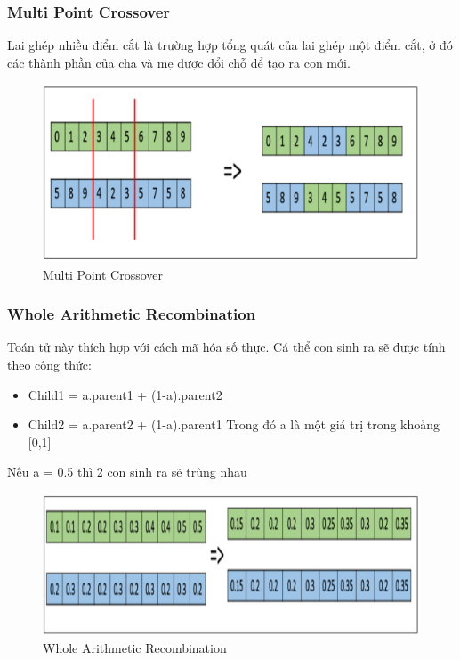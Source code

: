 \documentclass[a4paper,12pt]{report}
\begin{document}
\subsubsection{Multi Point Crossover}
Lai ghép nhiều điểm cắt là trường hợp tổng quát của lai ghép một điểm cắt, ở đó các thành phần của cha và mẹ được đổi chỗ để tạo ra con mới.
\begin{figure}[H]
\centering
\includegraphics[scale=0.4]{multi_point_crossover.png}
\caption{Multi Point Crossover}
\end{figure}

\subsubsection{Whole Arithmetic Recombination}
Toán tử này thích hợp với cách mã hóa số thực. Cá thể con sinh ra sẽ được tính theo công thức:
\begin{itemize}
\item Child1 = a.parent1 + (1-a).parent2 
\item Child2 = a.parent2 + (1-a).parent1 
Trong đó a là một giá trị trong khoảng [0,1]
\end{itemize}
Nếu a = 0.5 thì 2 con sinh ra sẽ trùng nhau
\begin{figure}[H]
\centering 
\includegraphics[scale=0.4]{whole_arithmetic_recombination.png}
\caption{Whole Arithmetic Recombination}
\end{figure}
\end{document}

